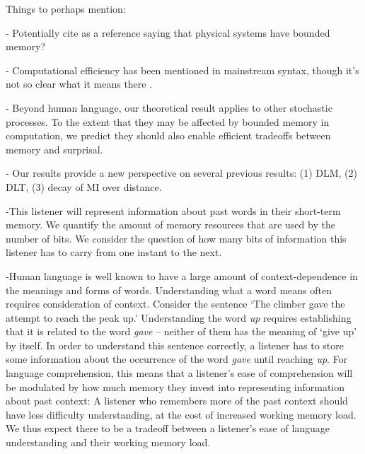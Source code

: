 \documentclass[11pt,letterpaper]{article}
\newcommand{\jd}[1]{\textcolor{Red}{[jd: #1]}}
\begin{document}
Things to perhaps mention:

- Potentially cite \cite{PhysRevLett.115.098701} as a reference saying that physical systems have bounded memory?

- Computational efficiency has been mentioned in mainstream syntax, though it's not so clear what it means there \citep{chomsky2005three,hauser2002faculty}.

- Beyond human language, our theoretical result applies to other stochastic processes. To the extent that they may be affected by bounded memory in computation, we predict they should also enable efficient tradeoffs between memory and surprisal.

- Our results provide a new perspective on several previous results: (1) DLM, (2) DLT, (3) decay of MI over distance.







-This listener will represent information about past words in their short-term memory.
We quantify the amount of memory resources that are used by the number of bits.
We consider the question of how many bits of information this listener has to carry from one instant to the next.  %

-Human language is well known to have a large amount of context-dependence in the meanings and forms of words.
Understanding what a word means often requires consideration of context. 
Consider the sentence `The climber gave the attempt to reach the peak up.'
Understanding the word \emph{up} requires establishing that it is related to the word \emph{gave} -- neither of them has the meaning of `give up' by itself.
In order to understand this sentence correctly, a listener has to store some information about the occurrence of the word \emph{gave} until reaching \emph{up}.
For language comprehension, this means that a listener's ease of comprehension will be modulated by how much memory they invest into representing information about past context:
A listener who remembers more of the past context should have less difficulty understanding, at the cost of increased working memory load. 
We thus expect there to be a tradeoff between a listener's ease of language understanding and their working memory load.



%
\end{document}
